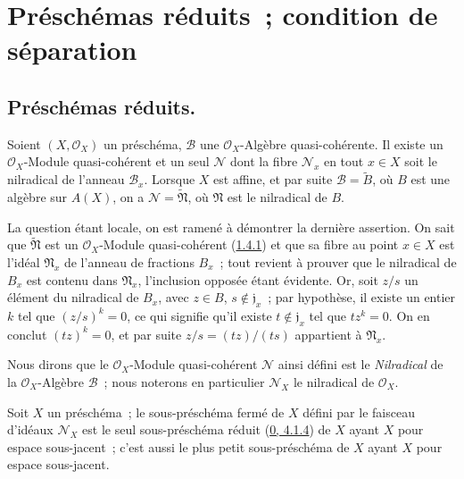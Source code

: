 \section{Préschémas réduits~; condition de séparation}
\label{section:I.5-fr}

\subsection{Préschémas réduits.}
\label{subsection:I.5.1-fr}

\begin{proposition}[5.1.1]
\label{I.5.1.1-fr}
Soient $(X,\mathscr{O}_X)$ un préschéma, $\mathscr{B}$ une
$\mathscr{O}_X$-Algèbre quasi-cohérente. Il existe un
$\mathscr{O}_X$-Module quasi-cohérent et un seul $\mathscr{N}$ dont la fibre
$\mathscr{N}_x$ en tout $x\in X$ soit le nilradical de l'anneau
$\mathscr{B}_x$. Lorsque $X$ est affine, et par suite
$\mathscr{B}=\widetilde{B}$, où $B$ est une algèbre sur $A(X)$, on a
$\mathscr{N}=\widetilde{\mathfrak{N}}$, où $\mathfrak{N}$ est le nilradical
de $B$.
\end{proposition}

La question étant locale, on est ramené à démontrer la dernière assertion. On
sait que $\widetilde{\mathfrak{N}}$ est un $\mathscr{O}_X$-Module
quasi-cohérent (\hyperref[I.1.4.1-fr]{1.4.1}) et que sa fibre au point
$x\in X$ est l'idéal $\mathfrak{N}_x$ de l'anneau de fractions $B_x$~; tout
revient à prouver que le nilradical de $B_x$ est contenu dans
$\mathfrak{N}_x$, l'inclusion opposée étant évidente. Or, soit $z/s$ un
élément du nilradical de $B_x$, avec $z\in B$, $s\notin\mathfrak{j}_x$~; par
hypothèse, il existe un entier $k$ tel que $(z/s)^k=0$, ce qui signifie qu'il
existe $t\notin\mathfrak{j}_x$ tel que $tz^k=0$. On en conclut $(tz)^k=0$, et
par suite $z/s=(tz)/(ts)$ appartient à $\mathfrak{N}_x$.

Nous dirons que le $\mathscr{O}_X$-Module quasi-cohérent $\mathscr{N}$ ainsi
défini est le \emph{Nilradical} de la $\mathscr{O}_X$-Algèbre $\mathscr{B}$~;
nous noterons en particulier $\mathscr{N}_X$ le nilradical de
$\mathscr{O}_X$.

\begin{corollary}[5.1.2]
\label{I.5.1.2-fr}
Soit $X$ un préschéma~; le sous-préschéma fermé de $X$ défini par le faisceau
d'idéaux $\mathscr{N}_X$ est le seul sous-préschéma réduit
(\hyperref[0.4.1.4-fr]{0, 4.1.4}) de $X$ ayant $X$ pour espace sous-jacent~;
c'est aussi le plus petit sous-préschéma de $X$ ayant $X$ pour espace
sous-jacent.
\end{corollary}

